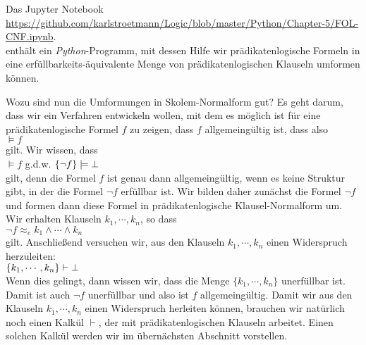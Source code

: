 \noindent
Das Jupyter Notebook
\\[0.2cm]
\hspace*{0.8cm}
\href{https://github.com/karlstroetmann/Logic/blob/master/Python/Chapter-5/FOL-CNF.ipynb}{https://github.com/karlstroetmann/Logic/blob/master/Python/Chapter-5/FOL-CNF.ipynb}.
\\[0.2cm]
enthält ein \textsl{Python}-Programm, mit dessen Hilfe wir prädikatenlogische Formeln in eine \linebreak
erfüllbarkeits-äquivalente Menge von prädikatenlogischen Klauseln umformen können.

Wozu sind nun die Umformungen in Skolem-Normalform gut?  Es geht darum, dass wir 
ein Verfahren entwickeln wollen, mit dem es möglich ist für eine prädikatenlogische Formel
$f$ zu zeigen, dass $f$ allgemeingültig ist, dass also \\[0.2cm]
\hspace*{1.3cm} $\models f$ \\[0.2cm]
gilt.  Wir wissen, dass \\[0.2cm]
\hspace*{1.3cm} $\models f$ \quad g.d.w. \quad $\{\neg f\} \models \bot$ \\[0.2cm]
gilt, denn die Formel $f$ ist genau dann allgemeingültig, wenn es keine Struktur gibt, in
der die Formel $\neg f$ erfüllbar ist. 
 Wir bilden daher zunächst die Formel $\neg f$ und formen dann diese Formel in prädikatenlogische
Klausel-Normalform um.  Wir erhalten Klauseln $k_1, \cdots, k_n$, so dass  \\[0.2cm]
\hspace*{1.3cm} $\neg f \approx_e k_1 \wedge \cdots \wedge k_n$ \\[0.2cm]
gilt.  Anschließend versuchen wir,
aus den Klauseln $k_1,\cdots,k_n$ einen Widerspruch herzuleiten: \\[0.2cm]
\hspace*{1.3cm} $\{k_1, \cdots, k_n\} \vdash \bot$ \\[0.2cm]
Wenn dies gelingt, dann wissen wir, dass die Menge $\{k_1, \cdots, k_n\}$ unerfüllbar ist.
Damit ist auch $\neg f$ unerfüllbar und also ist $f$ allgemeingültig.
Damit wir aus den Klauseln $k_1,\cdots,k_n$ einen Widerspruch herleiten können,
brauchen wir natürlich noch einen Kalkül $\vdash$, der mit prädikatenlogischen Klauseln arbeitet. 
Einen solchen Kalkül werden wir im übernächsten Abschnitt vorstellen.

